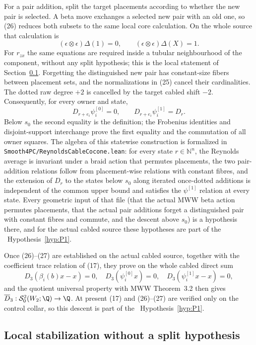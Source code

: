For a pair addition, split the target placements according to whether the
new pair is selected.  A beta move exchanges a selected new pair with an old
one, so (26) reduces both subsets to the same local core calculation.  On the
whole source that calculation is
\[
(\epsilon\otimes\epsilon)\Delta(1)=0,\qquad
(\epsilon\otimes\epsilon)\Delta(X)=1.
\]
For $r_{zx}$ the same equations are required inside a tubular neighbourhood
of the component, without any split hypothesis; this is the local statement
of Section~\ref{sec:local-stabilization}.  Forgetting the distinguished new pair has constant-size fibers
between placement sets, and the normalizations in (25) cancel their
cardinalities.  The dotted raw degree $+2$ is cancelled by the target cabled
shift $-2$.  Consequently, for every owner and state,
\[
D_{r+e_i}\psi_i^{[0]}=0,\qquad
D_{r+e_i}\psi_i^{[1]}=D_r.
\tag{27}
\]
Below $s_0$ the second equality is the definition; the Frobenius identities
and disjoint-support interchange prove the first equality and the commutation
of all owner squares.  The algebra of this statewise construction is
formalized in \texttt{Smooth4PC/ReynoldsCableCocone.lean}: for every state
$r\in\mathbb N^n$, the Reynolds average is invariant under a braid action
that permutes placements, the two pair-addition relations follow from
placement-wise relations with constant fibres, and the extension of $D_r$
to the states below $s_0$ along iterated once-dotted additions is
independent of the common upper bound and satisfies the $\psi^{[1]}$
relation at every state.  Every geometric input of that file (that the
actual MWW beta action permutes placements, that the actual pair additions
forget a distinguished pair with constant fibres and commute, and the
descent above $s_0$) is a hypothesis there, and for the actual cabled
source these hypotheses are part of the \Open\ Hypothesis~\ref{hyp:P1}.

Once (26)--(27) are established on the actual cabled source, together with
the coefficient trace relation of (17), they prove on the whole cabled
direct sum
\[
D_3(\beta_i(b)x-x)=0,\quad
D_3(\psi_i^{[0]}x)=0,\quad
D_3(\psi_i^{[1]}x-x)=0,
\]
and the quotient universal property with MWW Theorem~3.2 then gives
$\overline D_3:\mathcal S^2_0(W_2;\Q)\to\Q$.  At present (17) and
(26)--(27) are verified only on the control collar, so this descent is part
of the \Open\ Hypothesis~\ref{hyp:P1}.

\subsection{Local stabilization without a split hypothesis}
\label{sec:local-stabilization}

